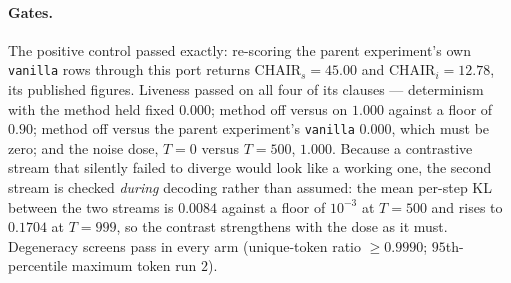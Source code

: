 \paragraph{Gates.} The positive control passed exactly: re-scoring the parent experiment's own
\texttt{vanilla} rows through this port returns $\mathrm{CHAIR}_s = 45.00$ and
$\mathrm{CHAIR}_i = 12.78$, its published figures. Liveness passed on all four of its clauses ---
determinism with the method held fixed $0.000$; method off versus on $1.000$ against a floor of
$0.90$; method off versus the parent experiment's \texttt{vanilla} $0.000$, which must be zero; and the
noise dose, $T=0$ versus $T=500$, $1.000$. Because a contrastive stream that silently failed to diverge would look
like a working one, the second stream is
checked \emph{during} decoding rather than assumed: the mean per-step KL between the two streams is
$0.0084$ against a floor of $10^{-3}$ at $T=500$ and rises to $0.1704$ at $T=999$, so the contrast
strengthens with the dose as it must. Degeneracy screens pass in every arm (unique-token ratio
$\geq 0.9990$; $95$th-percentile maximum token run $2$).

